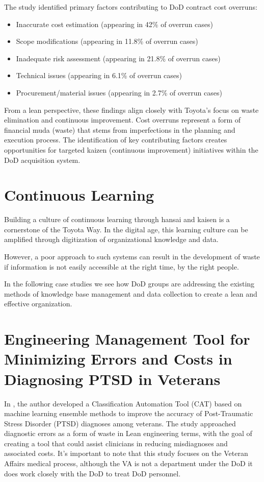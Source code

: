 \documentclass{article}
\begin{document}
			The study identified primary factors contributing to DoD contract cost overruns:
			\begin{itemize}
				\item Inaccurate cost estimation (appearing in 42\% of overrun cases)
				\item Scope modifications (appearing in 11.8\% of overrun cases)
				\item Inadequate risk assessment (appearing in 21.8\% of overrun cases)
				\item Technical issues (appearing in 6.1\% of overrun cases)
				\item Procurement/material issues (appearing in 2.7\% of overrun cases)
			\end{itemize}


			From a lean perspective, these findings align closely with Toyota's focus on waste elimination and continuous improvement. 
			Cost overruns represent a form of financial muda (waste) that stems from imperfections in the planning and execution process.
			The identification of key contributing factors creates opportunities for targeted kaizen (continuous improvement) initiatives within the DoD acquisition system.


	\section{Continuous Learning}

		Building a culture of continuous learning through hansai and kaisen is a cornerstone of the Toyota Way.
		In the digital age, this learning culture can be amplified through digitization of organizational knowledge and data.

		However, a poor approach to such systems can result in the development of waste if information is not easily accessible at the right time, by the right people.

		In the following case studies we see how DoD groups are addressing the existing methods of knowledge base management and data collection to create a lean and effective organization.

		\section{Engineering Management Tool for Minimizing Errors and Costs in Diagnosing PTSD in Veterans \cite{Le2023}}

			In \cite{Le2023}, the author developed a Classification Automation Tool (CAT) based on machine learning ensemble methods to improve the accuracy of Post-Traumatic Stress Disorder (PTSD) diagnoses among veterans. 
			The study approached diagnostic errors as a form of waste in Lean engineering terms, with the goal of creating a tool that could assist clinicians in reducing misdiagnoses and associated costs.
			It's important to note that this study focuses on the Veteran Affairs medical process, although the VA is not a department under the DoD it does work closely with the DoD to treat DoD personnel.
\end{document}
